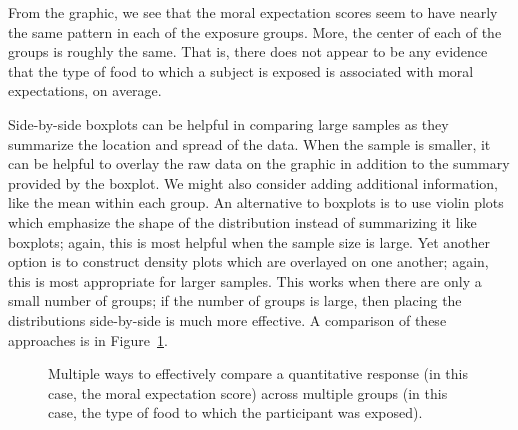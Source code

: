 \documentclass[
  letterpaper,
  DIV=11,
  numbers=noendperiod]{scrreprt}
\theoremstyle{plain}
\theoremstyle{definition}
\theoremstyle{definition}
\theoremstyle{remark}
\begin{document}
From the graphic, we see that the moral expectation scores seem to have
nearly the same pattern in each of the exposure groups. More, the center
of each of the groups is roughly the same. That is, there does not
appear to be any evidence that the type of food to which a subject is
exposed is associated with moral expectations, on average.

Side-by-side boxplots can be helpful in comparing large samples as they
summarize the location and spread of the data. When the sample is
smaller, it can be helpful to overlay the raw data on the graphic in
addition to the summary provided by the boxplot. We might also consider
adding additional information, like the mean within each group. An
alternative to boxplots is to use violin plots which emphasize the shape
of the distribution instead of summarizing it like boxplots; again, this
is most helpful when the sample size is large. Yet another option is to
construct density plots which are overlayed on one another; again, this
is most appropriate for larger samples. This works when there are only a
small number of groups; if the number of groups is large, then placing
the distributions side-by-side is much more effective. A comparison of
these approaches is in
Figure~\ref{fig-anovasummaries-organic-comparison}.

\begin{figure}


\caption{\label{fig-anovasummaries-organic-comparison}Multiple ways to
effectively compare a quantitative response (in this case, the moral
expectation score) across multiple groups (in this case, the type of
food to which the participant was exposed).}

\end{figure}%
\end{document}

